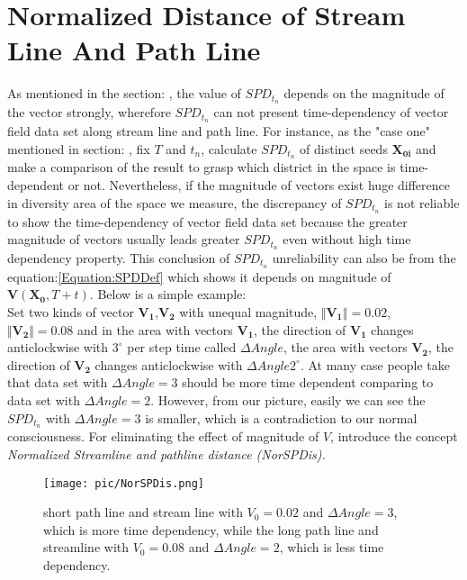 \documentclass[
     11pt,         %
     a4paper,      %
     oneside,
     ]{article}
\newcommand{\vect}[1]{\boldsymbol{#1}}
\begin{document}
	 
\section{Normalized Distance of Stream Line And Path Line}
\label{sec:Normal Distance}
As mentioned in the section: , the value of $SPD_{t_{n}}$ depends on the magnitude of the vector strongly, wherefore $SPD_{t_{n}}$ can not present time-dependency of vector field data set along stream line and path line. For instance, as the "case one" mentioned in section: , fix $T$ and $t_{n}$, calculate $SPD_{t_{n}}$ of distinct seeds $\vect{X_{0i}}$ and make a comparison of the result to grasp which district in the space is time-dependent or not. Nevertheless, if the magnitude of vectors exist huge difference in diversity area of the space we measure, the discrepancy of $SPD_{t_{n}}$ is not reliable to show the time-dependency of vector field data set because the greater magnitude of vectors usually leads greater $SPD_{t_{n}}$ even without high time dependency property. This conclusion of $SPD_{t_{n}}$ unreliability can also be from the equation:\ref{Equation:SPDDef} which shows it depends on magnitude of $\vect{V}(\vect{X_{0}}, T+t)$. Below is a simple example:\\
Set two kinds of vector $\vect{V_{1}}$,$\vect{V_{2}}$ with unequal magnitude, $\Vert\vect{V_{1}}\Vert=0.02$, $\Vert\vect{V_{2}\Vert=0.08}$ and in the area with vectors $\vect{V_{1}}$, the direction of $\vect{V_{1}}$ changes anticlockwise with $3^{\circ}$ per step time called $\Delta Angle$, the area with vectors $\vect{V_{2}}$, the direction of $\vect{V_{2}}$ changes anticlockwise with $\Delta Angle2^{\circ}$. At many case people take that data set with $\Delta Angle=3$ should be more time dependent comparing to data set with $\Delta Angle=2$. However, from  our picture, easily we can see the $SPD_{t_{n}}$ with $\Delta Angle=3$ is smaller, which is a contradiction to our normal consciousness. For eliminating the effect of magnitude of $V$, introduce the concept \textit{Normalized Streamline and pathline distance (NorSPDis).}
\begin{figure}[H]
	\centering
	\texttt{[image: pic/NorSPDis.png]}
	\caption{\tiny short path line and stream line with $V_{0}=0.02$ and $\Delta Angle=3$, which is more time dependency, while the long path line and streamline with $V_{0}=0.08$ and $\Delta Angle=2$, which is less time dependency.}
	\label{fig:NorSPDis}
\end{figure}
\end{document}
